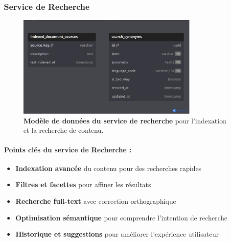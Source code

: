 \subsubsection{Service de Recherche}
\begin{figure}[p]
  \centering
  \includegraphics[width=0.8\textwidth,keepaspectratio]{week_1_img/services_db_screanshots/Screenshot 2025-06-06 at 15-08-52 Search_Service.pdf.png}
  \caption{\textbf{Modèle de données du service de recherche} pour l'indexation et la recherche de contenu.}
  \label{fig:search_service}
\end{figure}

\vspace{5pt}
\small
\paragraph{Points clés du service de Recherche :}
\begin{itemize}[leftmargin=*,noitemsep,topsep=0pt]
  \item \textbf{Indexation avancée} du contenu pour des recherches rapides
  \item \textbf{Filtres et facettes} pour affiner les résultats
  \item \textbf{Recherche full-text} avec correction orthographique
  \item \textbf{Optimisation sémantique} pour comprendre l'intention de recherche
  \item \textbf{Historique et suggestions} pour améliorer l'expérience utilisateur
\end{itemize}
\normalsize
\clearpage

